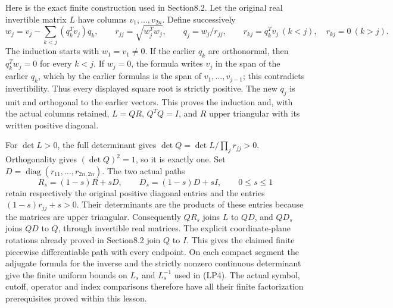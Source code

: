 \documentclass[
  11pt,
]{article}
\begin{document}
Here is the exact finite construction used in Section8.2. Let the
original real invertible matrix \(L\) have columns
\(v_1,\ldots,v_{2n}\). Define successively \[
 w_j=v_j-\sum_{k<j}(q_k^Tv_j)q_k,\qquad
 r_{jj}=\sqrt{w_j^Tw_j},\qquad q_j=w_j/r_{jj},\qquad
 r_{kj}=q_k^Tv_j\ (k<j),\quad r_{kj}=0\ (k>j).
 \tag{QR1}
\] The induction starts with \(w_1=v_1\ne0\). If the earlier \(q_k\) are
orthonormal, then \(q_k^Tw_j=0\) for every \(k<j\). If \(w_j=0\), the
formula writes \(v_j\) in the span of the earlier \(q_k\), which by the
earlier formulas is the span of \(v_1,\ldots,v_{j-1}\); this contradicts
invertibility. Thus every displayed square root is strictly positive.
The new \(q_j\) is unit and orthogonal to the earlier vectors. This
proves the induction and, with the actual columns retained, \(L=QR\),
\(Q^TQ=I\), and \(R\) upper triangular with its written positive
diagonal.

For \(\det L>0\), the full determinant gives
\(\det Q=\det L/\prod_jr_{jj}>0\). Orthogonality gives \((\det Q)^2=1\),
so it is exactly one. Set
\(D=\operatorname{diag}(r_{11},\ldots,r_{2n,2n})\). The two actual paths
\[
 R_s=(1-s)R+sD,\qquad D_s=(1-s)D+sI,\qquad 0\le s\le1
 \tag{QR2}
\] retain respectively the original positive diagonal entries and the
entries \((1-s)r_{jj}+s>0\). Their determinants are the products of
these entries because the matrices are upper triangular. Consequently
\(QR_s\) joins \(L\) to \(QD\), and \(QD_s\) joins \(QD\) to \(Q\),
through invertible real matrices. The explicit coordinate-plane
rotations already proved in Section8.2 join \(Q\) to \(I\). This gives
the claimed finite piecewise differentiable path with every endpoint. On
each compact segment the adjugate formula for the inverse and the
strictly nonzero continuous determinant give the finite uniform bounds
on \(L_s\) and \(L_s^{-1}\) used in (LP4). The actual symbol, cutoff,
operator and index comparisons therefore have all their finite
factorization prerequisites proved within this lesson.
\end{document}
